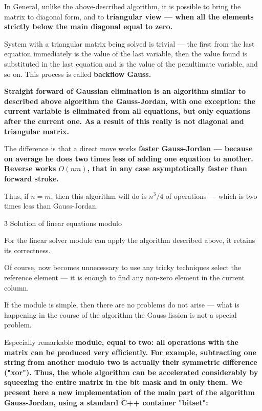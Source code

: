 In General, unlike the above-described algorithm, it is possible to bring the matrix to diagonal form, and to \bf{triangular view} --- when all the elements strictly below the main diagonal equal to zero.

System with a triangular matrix being solved is trivial --- the first from the last equation immediately is the value of the last variable, then the value found is substituted in the last equation and is the value of the penultimate variable, and so on. This process is called \bf{backflow} Gauss.

\bf{Straight forward} of Gaussian elimination is an algorithm similar to described above algorithm the Gauss-Jordan, with one exception: the current variable is eliminated from all equations, but only equations after the current one. As a result of this really is not diagonal and triangular matrix.

The difference is that a direct move works \bf{faster} Gauss-Jordan --- because on average he does two times less of adding one equation to another. Reverse works $O(nm)$, that in any case asymptotically faster than forward stroke.

Thus, if $n=m$, then this algorithm will do is $n^3/4$ of operations --- which is two times less than Gauss-Jordan.


\h3{ Solution of linear equations modulo }

For the linear solver module can apply the algorithm described above, it retains its correctness.

Of course, now becomes unnecessary to use any tricky techniques select the reference element --- it is enough to find any non-zero element in the current column.

If the module is simple, then there are no problems do not arise --- what is happening in the course of the algorithm the Gauss fission is not a special problem.

Especially remarkable \bf{module, equal to two}: all operations with the matrix can be produced very efficiently. For example, subtracting one string from another modulo two is actually their symmetric difference ("xor"). Thus, the whole algorithm can be accelerated considerably by squeezing the entire matrix in the bit mask and in only them. We present here a new implementation of the main part of the algorithm Gauss-Jordan, using a standard C++ container "bitset":

